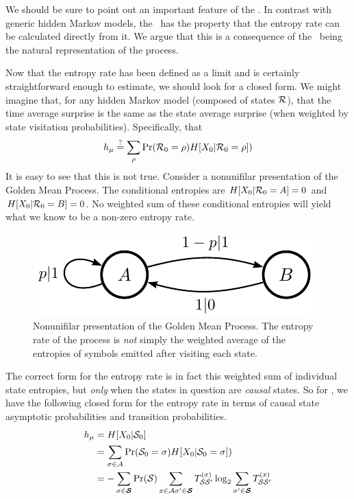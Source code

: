 We should be sure to point out an important feature of the \eM. In contrast with generic hidden Markov models, the \eM\ has the property that the entropy rate can be calculated directly from it. We argue that this is a consequence of the \eM\ being the natural representation of the process. 

Now that the entropy rate has been defined as a limit and is certainly straightforward enough to estimate, we should look for a closed form. We might imagine that, for any hidden Markov model (composed of states $\mathcal{R}$), that the time average surprise is the same as the state average surprise (when weighted by state visitation probabilities). Specifically, that
\begin{align*}
h_\mu \stackrel{?}{=} \sum_{\rho}{\Pr(\mathcal{R}_0 = \rho) H[{X}_0 | \mathcal{R}_0 = \rho])}
\end{align*}
It is easy to see that this is not true. Consider a nonunifilar presentation of the Golden Mean Process. The conditional entropies are $H[{X}_0 | \mathcal{R}_0=A] = 0$ and $H[{X}_0 | \mathcal{R}_0=B] = 0$. No weighted sum of these conditional entropies will yield what we know to be a non-zero entropy rate.
\begin{figure}[h!]
\centering
\includegraphics[scale=1.0]{../chapter1/figures/tex/GM_nonunif}
\caption{Nonunifilar presentation of the Golden Mean Process. The entropy rate of the process is \emph{not} simply the weighted average of the entropies of symbols emitted after visiting each state.}
\label{fig:GM_nonunif}
\end{figure}
The correct form for the entropy rate is in fact this weighted sum of individual state entropies, but \emph{only} when the states in question are \emph{causal} states. So for \eMs, we have the following closed form for the entropy rate in terms of causal state asymptotic probabilities and transition probabilities.
\begin{align*}
h_\mu & = H[{X}_0|\mathcal{S}_0] \\
&=\sum_{\sigma \in \mathcal{A}}{\Pr(\mathcal{S}_0 = \sigma) H[{X}_0 | \mathcal{S}_0 = \sigma])}\\
  & = - \sum_{\sigma \in \boldsymbol{\mathcal{S}}} \Pr(\mathcal{S})
  \sum_{{x} \in \mathcal{A} {\sigma^{\prime}} \in \boldsymbol{\mathcal{S}}} T^{({x})}_{\mathcal{S} \mathcal{S}^\prime}
  \log_2 \sum_{{\sigma^{\prime}} \in \boldsymbol{\mathcal{S}}}{T^{({x})}_{\mathcal{S}\mathcal{S}^\prime}}
\end{align*}

